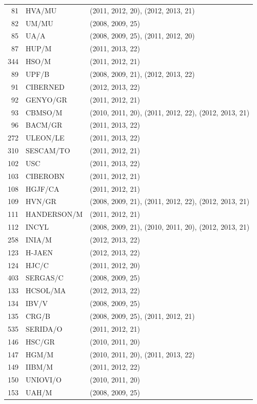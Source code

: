 \documentclass[a4paper,twoside,10pt]{article}
\begin{document}
\begin{center}
\begin{longtable}{rll}
 81 & HVA/MU      & (2011, 2012, 20), (2012, 2013, 21) \\
 82 & UM/MU       & (2008, 2009, 25) \\
 85 & UA/A        & (2008, 2009, 25), (2011, 2012, 20) \\
 87 & HUP/M       & (2011, 2013, 22) \\
344 & HSO/M       & (2011, 2012, 21) \\
 89 & UPF/B       & (2008, 2009, 21), (2012, 2013, 22) \\
 91 & CIBERNED    & (2012, 2013, 22) \\
 92 & GENYO/GR    & (2011, 2012, 21) \\
 93 & CBMSO/M     & (2010, 2011, 20), (2011, 2012, 22), (2012, 2013, 21) \\
 96 & BACM/GR     & (2011, 2013, 22) \\
272 & ULEON/LE    & (2011, 2013, 22) \\
310 & SESCAM/TO   & (2011, 2012, 21) \\
102 & USC         & (2011, 2013, 22) \\
103 & CIBEROBN    & (2011, 2012, 21) \\
108 & HGJF/CA     & (2011, 2012, 21) \\
109 & HVN/GR      & (2008, 2009, 21), (2011, 2012, 22), (2012, 2013, 21) \\
111 & HANDERSON/M & (2011, 2012, 21) \\
112 & INCYL       & (2008, 2009, 21), (2010, 2011, 20), (2012, 2013, 21) \\
258 & INIA/M      & (2012, 2013, 22) \\
123 & H-JAEN      & (2012, 2013, 22) \\
124 & HJC/C       & (2011, 2012, 20) \\
403 & SERGAS/C    & (2008, 2009, 25) \\
133 & HCSOL/MA    & (2012, 2013, 22) \\
134 & IBV/V       & (2008, 2009, 25) \\
135 & CRG/B       & (2008, 2009, 25), (2011, 2012, 21) \\
535 & SERIDA/O    & (2011, 2012, 21) \\
146 & HSC/GR      & (2010, 2011, 20) \\
147 & HGM/M       & (2010, 2011, 20), (2011, 2013, 22) \\
149 & IIBM/M      & (2011, 2012, 22) \\
150 & UNIOVI/O    & (2010, 2011, 20) \\
153 & UAH/M       & (2008, 2009, 25) \\

\end{longtable}
\end{center}
\end{document}
